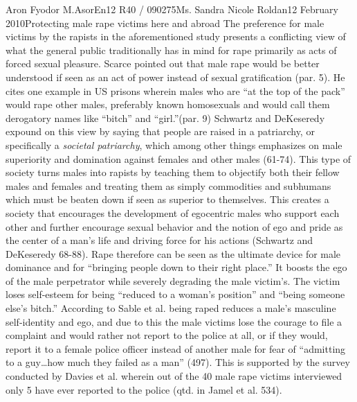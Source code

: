\documentclass[12pt,letterpaper]{article}
\begin{document}
\begin{mla}{Aron Fyodor M.}{Asor}{En12 R40 / 090275}{Ms. Sandra Nicole Roldan}{12 February 2010}{Protecting male rape victims here and abroad}
%
%
The preference for male victims by the rapists in the aforementioned study presents a conflicting view of what the general public traditionally has in mind for rape primarily as acts of forced sexual pleasure. Scarce pointed out that male rape would be better understood if seen as an act of power instead of sexual gratification (par. 5). He cites one example in US prisons wherein males who are ``at the top of the pack'' would rape other males, preferably known homosexuals and would call them derogatory names like ``bitch'' and ``girl.''(par. 9) Schwartz and DeKeseredy expound on this view by saying that people are raised in a patriarchy, or specifically a \textit{societal patriarchy}, which among other things emphasizes on male superiority and domination against females and other males (61-74). This type of society turns males into rapists by teaching them to objectify both their fellow males and females and treating them as simply commodities and subhumans which must be beaten down if seen as superior to themselves. This creates a society that encourages the development of egocentric males who support each other and further encourage sexual behavior and the notion of ego and pride as the center of a man's life and driving force for his actions (Schwartz and DeKeseredy 68-88). Rape therefore can be seen as the ultimate device for male dominance and for ``bringing people down to their right place.'' It boosts the ego of the male perpetrator while severely degrading the male victim's. The victim loses self-esteem for being ``reduced to a woman's position'' and ``being someone else's bitch.'' According to Sable et al. being raped reduces a male's masculine self-identity and ego, and due to this the male victims lose the courage to file a complaint and would rather not report to the police at all, or if they would, report it to a female police officer instead of another male for fear of ``admitting to a guy\ldots how much they failed as a man'' (497). This is supported by the survey conducted by Davies et al. wherein out of the 40 male rape victims interviewed only 5 have ever reported to the police (qtd. in Jamel et al. 534).
%
%

\end{mla}
\end{document}
